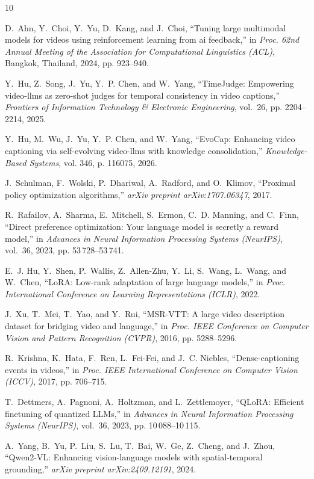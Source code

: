 \documentclass[journal]{IEEEtai}
\begin{document}
\begin{thebibliography}{10}

D.~Ahn, Y.~Choi, Y.~Yu, D.~Kang, and J.~Choi, ``Tuning large multimodal models for videos using reinforcement learning from ai feedback,'' in \emph{Proc. 62nd Annual Meeting of the Association for Computational Linguistics (ACL)}, Bangkok, Thailand, 2024, pp. 923--940.

Y.~Hu, Z.~Song, J.~Yu, Y.~P. Chen, and W.~Yang, ``TimeJudge: Empowering video-llms as zero-shot judges for temporal consistency in video captions,'' \emph{Frontiers of Information Technology \& Electronic Engineering}, vol.~26, pp. 2204--2214, 2025.

Y.~Hu, M.~Wu, J.~Yu, Y.~P. Chen, and W.~Yang, ``EvoCap: Enhancing video captioning via self-evolving video-llms with knowledge consolidation,'' \emph{Knowledge-Based Systems}, vol. 346, p. 116075, 2026.

J.~Schulman, F.~Wolski, P.~Dhariwal, A.~Radford, and O.~Klimov, ``Proximal policy optimization algorithms,'' \emph{arXiv preprint arXiv:1707.06347}, 2017.

R.~Rafailov, A.~Sharma, E.~Mitchell, S.~Ermon, C.~D. Manning, and C.~Finn, ``Direct preference optimization: Your language model is secretly a reward model,'' in \emph{Advances in Neural Information Processing Systems (NeurIPS)}, vol.~36, 2023, pp. 53\,728--53\,741.

E.~J. Hu, Y.~Shen, P.~Wallis, Z.~Allen-Zhu, Y.~Li, S.~Wang, L.~Wang, and W.~Chen, ``LoRA: Low-rank adaptation of large language models,'' in \emph{Proc. International Conference on Learning Representations (ICLR)}, 2022.

J.~Xu, T.~Mei, T.~Yao, and Y.~Rui, ``MSR-VTT: A large video description dataset for bridging video and language,'' in \emph{Proc. IEEE Conference on Computer Vision and Pattern Recognition (CVPR)}, 2016, pp. 5288--5296.

R.~Krishna, K.~Hata, F.~Ren, L.~Fei-Fei, and J.~C. Niebles, ``Dense-captioning events in videos,'' in \emph{Proc. IEEE International Conference on Computer Vision (ICCV)}, 2017, pp. 706--715.

T.~Dettmers, A.~Pagnoni, A.~Holtzman, and L.~Zettlemoyer, ``QLoRA: Efficient finetuning of quantized LLMs,'' in \emph{Advances in Neural Information Processing Systems (NeurIPS)}, vol.~36, 2023, pp. 10\,088--10\,115.

A.~Yang, B.~Yu, P.~Liu, S.~Lu, T.~Bai, W.~Ge, Z.~Cheng, and J.~Zhou, ``Qwen2-VL: Enhancing vision-language models with spatial-temporal grounding,'' \emph{arXiv preprint arXiv:2409.12191}, 2024.

\end{thebibliography}

\end{document}
